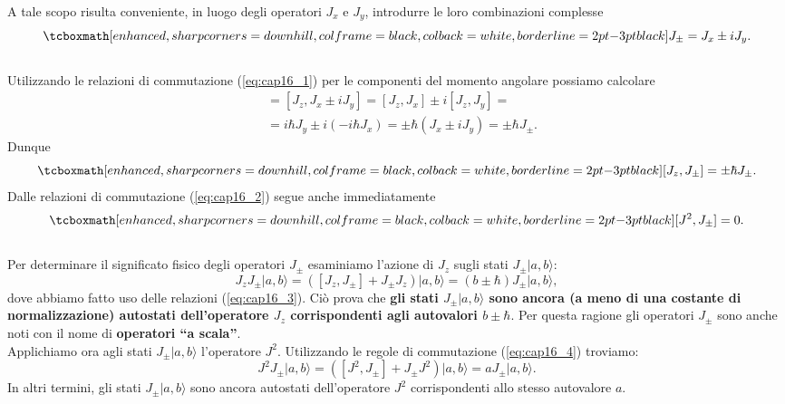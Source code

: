 \documentclass[a4paper,12pt,oneside]{book}
\begin{document}
A tale scopo risulta conveniente, in luogo degli operatori $J_x$ e $J_y$, introdurre le loro combinazioni complesse
	\begin{equation}
		\tcboxmath[enhanced, sharp corners=downhill, colframe=black, colback=white, borderline={2pt}{-3pt}{black}]{
			J_{\pm} = J_x \pm i J_y .
			}
	\end{equation}\\
Utilizzando le relazioni di commutazione (\ref{eq:cap16_1}) per le componenti del momento angolare possiamo calcolare
	\begin{align}
		[J_z , J_{\pm}] & =  [J_z , J_x \pm i J_y] = [J_z , J_x] \pm i [J_z ,J_y] = \nonumber \\
		& = i\hbar J_y \pm i (-i\hbar J_x) = \pm \hbar (J_x \pm i J_y ) = \pm \hbar J_{\pm} .
	\end{align}
Dunque
	\begin{equation}
		\tcboxmath[enhanced, sharp corners=downhill, colframe=black, colback=white, borderline={2pt}{-3pt}{black}]{
			[J_z , J_{\pm}] = \pm \hbar J_{\pm} .
			}
	\label{eq:cap16_3}
	\end{equation}
Dalle relazioni di commutazione (\ref{eq:cap16_2}) segue anche immediatamente
	\begin{equation}
		\tcboxmath[enhanced, sharp corners=downhill, colframe=black, colback=white, borderline={2pt}{-3pt}{black}]{
			[J^2 , J_{\pm}]=0 .
			}
	\label{eq:cap16_4}
	\end{equation}\\
	
Per determinare il significato fisico degli operatori $J_{\pm}$ esaminiamo l'azione di $J_z$ sugli stati $J_{\pm} \vert a, b \rangle$:
\begin{equation}
J_zJ_{\pm} \vert a, b \rangle =\left( [J_z,J_{\pm}] + J_{\pm}J_{z}\right)\vert a, b \rangle = (b \pm \hbar )J_{\pm} \vert a, b \rangle , 
\end{equation}
dove abbiamo fatto uso delle relazioni (\ref{eq:cap16_3}). Ciò prova che \textbf{gli stati $ J_{\pm} \vert a, b \rangle$ sono ancora (a meno di una costante di normalizzazione) autostati dell'operatore $J_z$ corrispondenti agli autovalori $b\pm \hbar$}. Per questa ragione gli operatori $J_{\pm}$ sono anche noti con il nome di \textbf{operatori ``a scala''}.\\

Applichiamo ora agli stati $ J_{\pm} \vert a, b \rangle$ l'operatore $J^2$. Utilizzando le regole di commutazione (\ref{eq:cap16_4}) troviamo:
	\begin{equation}
		J^2J_{\pm} \vert a, b \rangle = \left( [J^2,J_{\pm}] + J_{\pm}J^2\right)\vert a, b \rangle = a J_{\pm} \vert a, b \rangle .
	\end{equation}
In altri termini, gli stati $J_{\pm} \vert a, b \rangle$ sono ancora autostati dell'operatore $J^2$ corrispondenti allo stesso autovalore $a$.\\
\end{document}
